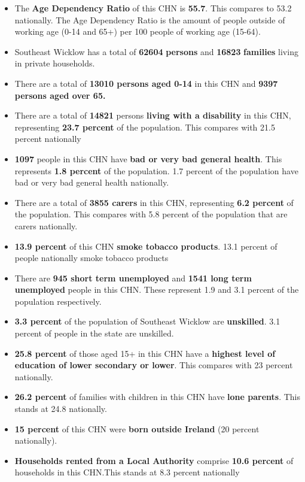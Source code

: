 \documentclass{article}
\begin{document}
\begin{itemize}

\item The \textbf{Age Dependency Ratio} of this CHN is  \textbf{55.7}. This compares to 53.2 nationally. The Age Dependency Ratio is the amount of people outside of working age (0-14 and 65+) per 100 people of working age (15-64). 

\item Southeast Wicklow has a total of \textbf{\num{62604}} \textbf{persons} and  \textbf{\num{16823}} \textbf{families} living in private households.

\item There are a total of \textbf{\num{13010} persons aged 0-14} in this CHN and \textbf{\num{9397} persons aged over 65.} 

\item There are a total of \textbf{\num{14821}} persons \textbf{living with a disability} in this CHN, representing \textbf{23.7 percent} of the population. This compares with  21.5 percent nationally

\item \textbf{\num{1097}} people in this CHN have \textbf{bad or very bad general health}. This represents \textbf{1.8 percent} of the population. 1.7 percent of the population have bad or very bad general health nationally. 

\item There are a total of \textbf{\num{3855} carers} in this CHN, representing \textbf{6.2 percent} of the population. This compares with 5.8 percent of the population that are carers nationally. 

\item \textbf{13.9 percent} of this CHN \textbf{smoke tobacco products}. 13.1 percent of people nationally smoke tobacco products

\item There are \textbf{\num{945} short term unemployed} and \textbf{\num{1541} long term unemployed} people in this CHN. These represent 1.9 and 3.1 percent of the population respectively.

\item  \textbf{3.3 percent} of the population of Southeast Wicklow are \textbf{unskilled}. 3.1 percent of people in the state are unskilled.

\item \textbf{25.8 percent} of those aged 15+ in this CHN have a \textbf{highest level of education of lower secondary or lower}. This compares with 23 percent nationally. 

\item \textbf{26.2 percent} of families with children in this CHN have \textbf{lone parents}. This stands at 24.8 nationally.

\item \textbf{15 percent} of this CHN were \textbf{born outside Ireland} (20 percent nationally).

\item \textbf{Households rented from a Local Authority} comprise \textbf{10.6 percent} of households in this CHN.This stands at 8.3 percent nationally

\end{itemize}
\end{document}
